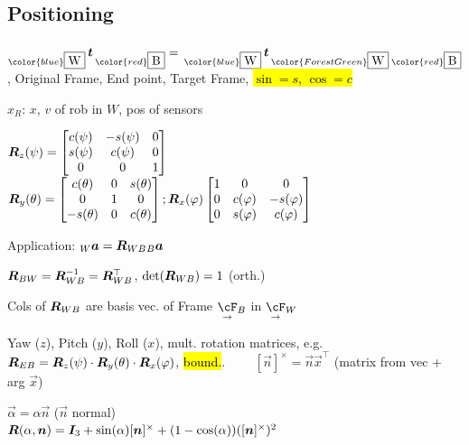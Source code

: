 \subsection{Positioning}
$_{\color{blue}\fbox{W}}\,\vec{t}\,_{\color{red}\fbox{B}} = \, _{\color{blue}\fbox{W}}\,\vec{t}\,_{\color{ForestGreen}\fbox{W}}\,_{\color{red}\fbox{B}}$,
{\color{blue} Original Frame}, {\color{red} End point}, {\color{ForestGreen} Target Frame},
\hl{$\sin = s$, $\cos = c$}

 $x_R$: $x$, $v$ of rob in $W$, pos of sensors

 $\bm{R}_{z}(\psi) = \begin{bmatrix}
        c(\psi) & -s(\psi) & 0 \\
        s(\psi) & c(\psi)  & 0 \\
        0       & 0        & 1
    \end{bmatrix}$\\
$\bm{R}_y(\theta) = \begin{bmatrix}
        c(\theta)  & 0 & s(\theta) \\
        0        & 1 & 0       \\
        -s(\theta) & 0 & c(\theta) \\
    \end{bmatrix};
    \bm{R}_x(\varphi)
    \begin{bmatrix}
        1 & 0       & 0        \\
        0 & c(\varphi) & -s(\varphi) \\
        0 & s(\varphi) & c(\varphi)
    \end{bmatrix}$

\shortremark Application: ${_W} \bm{a} = \bm{R}_{WB} {_B} \bm{a}$

\shortlemma $\bm{R}_{BW} = \bm{R}_{WB}^{-1} = \bm{R}_{WB}^\top$, $\det(\bm{R}_{WB}) = 1$ (orth.)

\shortremark Cols of $\bm{R}_{WB}$ are basis vec. of Frame $\underset{\rightarrow}{\cF}{_B}$ in $\underset{\rightarrow}{\cF}{_W}$

 Yaw ($z$), Pitch ($y$), Roll ($x$), mult. rotation matrices, e.g.
$\bm{R}_{EB} = \bm{R}_z(\psi) \cdot \bm{R}_y(\theta) \cdot \bm{R}_x(\varphi)$, \hl{bound.}.
$\qquad [\vec{n}]^\times = \vec{n} \vec{x}^\top$ (matrix from vec + arg $\vec{x}$)

$\vec{\alpha} = \alpha \vec{n}$ ($\vec{n}$ normal)\\
$\bm{R}(\alpha, \bm{n}) = \bm{I}_3 + \sin(\alpha)[\bm{n}]^\times + (1 - \cos(\alpha))([\bm{n}]^\times)^2$

